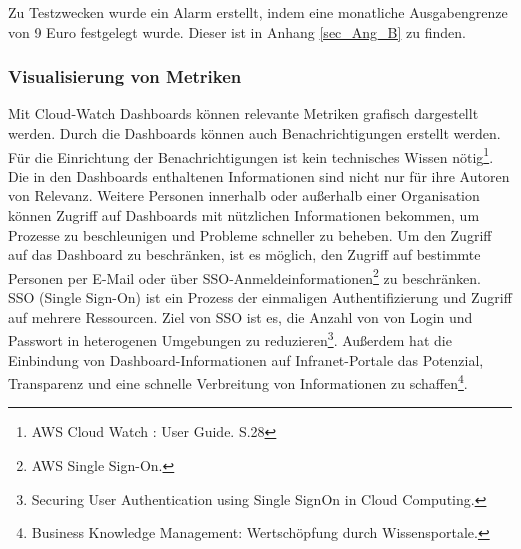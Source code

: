 Zu Testzwecken wurde ein Alarm erstellt, indem eine monatliche Ausgabengrenze von 9 Euro festgelegt wurde. Dieser ist in Anhang \ref{sec_Ang_B} zu finden.
\subsubsection*{Visualisierung von Metriken}
Mit Cloud-Watch Dashboards können relevante Metriken grafisch dargestellt werden. %
Durch die Dashboards können auch Benachrichtigungen erstellt werden. Für die Einrichtung der Benachrichtigungen ist kein technisches Wissen nötig\footnote{AWS Cloud Watch : User Guide. S.28\cite{AMZ14}}.
Die in den Dashboards enthaltenen Informationen sind nicht nur für ihre Autoren von Relevanz. Weitere Personen innerhalb oder außerhalb einer Organisation können Zugriff auf Dashboards mit nützlichen Informationen bekommen, um Prozesse zu beschleunigen und Probleme schneller zu beheben. Um den Zugriff auf das Dashboard zu beschränken, ist es möglich, den Zugriff auf bestimmte Personen per E-Mail oder über SSO-Anmeldeinformationen\footnote{ AWS Single Sign-On.\cite{AMZ33}} zu beschränken. SSO (Single Sign-On) ist ein Prozess der einmaligen Authentifizierung und Zugriff auf mehrere Ressourcen. Ziel von SSO ist es, die Anzahl von von Login und Passwort in heterogenen Umgebungen zu reduzieren\footnote{Securing User Authentication using Single SignOn in Cloud Computing\cite{SSO}.}. Außerdem hat die Einbindung von Dashboard-Informationen auf Infranet-Portale das Potenzial, Transparenz und eine schnelle Verbreitung von Informationen zu schaffen\footnote{Business Knowledge Management: Wertschöpfung durch Wissensportale\cite{BKM}.}. 
